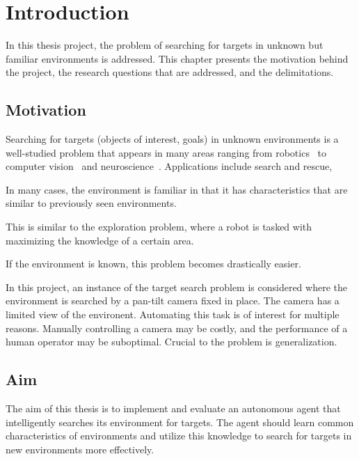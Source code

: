 \chapter{Introduction}
\label{cha:introduction}


In this thesis project, the problem of searching for targets in unknown but familiar environments is addressed. This chapter presents the motivation behind the project, the research questions that are addressed, and the delimitations. 

\section{Motivation}
\label{sec:motivation}

Searching for targets (objects of interest, goals) in unknown environments is a well-studied problem that appears in many areas ranging from robotics~\cite{} to computer vision~\cite{} and neuroscience~\cite{}. Applications include search and rescue, 

In many cases, the environment is familiar in that it has characteristics that are similar to previously seen environments.


This is similar to the exploration problem, where a robot is tasked with maximizing the knowledge of a certain area.



If the environment is known, this problem becomes drastically easier.

In this project, an instance of the target search problem is considered where the environment is searched by a pan-tilt camera fixed in place. The camera has a limited view of the environent. Automating this task is of interest for multiple reasons. Manually controlling a camera may be costly, and the performance of a human operator may be suboptimal. Crucial to the problem is generalization.

\section{Aim}
\label{sec:aim}

The aim of this thesis is to implement and evaluate an autonomous agent that intelligently searches its environment for targets. The agent should learn common characteristics of environments and utilize this knowledge to search for targets in new environments more effectively. 


